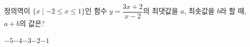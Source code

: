 \hspace*{2mm}\begin{minipage}[t]{\dimexpr\linewidth-2mm\relax}\vspace{0pt}
정의역이 $\{x \mid -2\le x\le 1\}$인 함수 $y=\dfrac{3x+2}{x-2}$의 최댓값을 $a$, 최솟값을 $b$라 할 때, $a+b$의 값은?
\begin{choices32}{$-5$}{$-4$}{$-3$}{$-2$}{$-1$}\end{choices32}\end{minipage}
